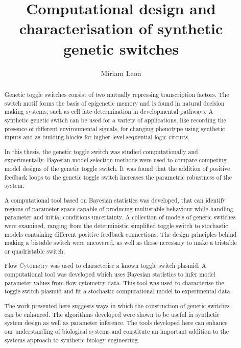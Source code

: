 \documentclass[]{phdthesis}
\title{Computational design and\\[0.2em]characterisation of synthetic\\[0.2em] genetic switches}
\author{Miriam Leon}
\begin{document}
\maketitle


\begin{abstract}
Genetic toggle switches consist of two mutually repressing transcription factors. The switch motif forms the basis of epigenetic memory and is found in natural decision making systems, such as cell fate determination in developmental pathways. A synthetic genetic switch can be used for a variety of applications, like recording the presence of different environmental signals, for changing phenotype using synthetic inputs and as building blocks for higher-level sequential logic circuits. 

In this thesis, the genetic toggle switch was studied computationally and experimentally. Bayesian model selection methods were used to compare competing model designs of the genetic toggle switch. It was found that the addition of positive feedback loops to the genetic toggle switch increases the parametric robustness of the system.

A computational tool based on Bayesian statistics was developed, that can identify regions of parameter space capable of producing multistable behaviour while handling parameter and initial conditions uncertainty. A collection of models of genetic switches were examined, ranging from the deterministic simplified toggle switch to stochastic models containing different positive feedback connections. The design principles behind making a bistable switch were uncovered, as well as those necessary to make a tristable or quadristable switch.

Flow Cytometry was used to characterise a known toggle switch plasmid. A computational tool was developed which uses Bayesian statistics to infer model parameter values from flow cytometry data. This tool was used to characterise the toggle switch plasmid and fit a stochastic computational model to experimental data.

The work presented here suggests ways in which the construction of genetic switches can be enhanced. The algorithms developed were shown to be useful in synthetic system design as well as parameter inference. The tools developed here can enhance our understanding of biological systems and constitute an important addition to the systems approach to synthetic biology engineering. 


\end{abstract}
\end{document}
